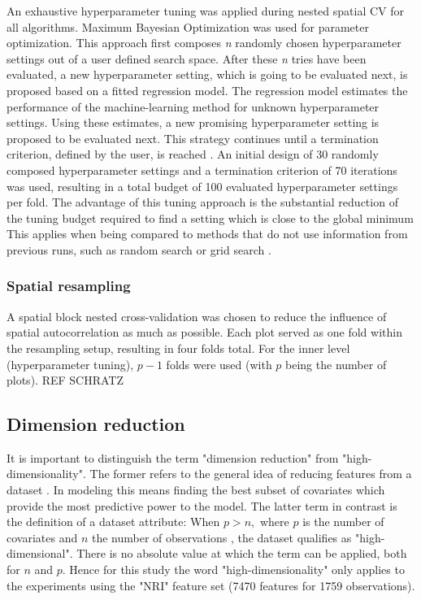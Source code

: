 \documentclass[review]{elsarticle}
\begin{document}
\noindent An exhaustive hyperparameter tuning was applied during nested spatial \ac{CV} for all algorithms.
Maximum Bayesian Optimization \citep{mlrmbo} was used for parameter optimization.
This approach first composes \textit{n} randomly chosen hyperparameter settings out of a user defined search space.
After these \textit{n} tries have been evaluated, a new hyperparameter setting, which is going to be evaluated next, is proposed based on a fitted regression model.
The regression model estimates the performance of the machine-learning method for unknown hyperparameter settings.
Using these estimates, a new promising hyperparameter setting is proposed to be evaluated next.
This strategy continues until a termination criterion, defined by the user, is reached \citep{hutter2011, jones1998}.
An initial design of 30 randomly composed hyperparameter settings and a termination criterion of 70 iterations was used, resulting in a total budget of 100 evaluated hyperparameter settings per fold.
The advantage of this tuning approach is the substantial reduction of the tuning budget required to find a setting which is close to the global minimum
This applies when being compared to methods that do not use information from previous runs, such as random search or grid search \citep{bergstra2012}.

\subsubsection{Spatial resampling}


\noindent A spatial block nested cross-validation was chosen to reduce the influence of spatial autocorrelation as much as possible.
Each plot served as one fold within the resampling setup, resulting in four folds total.
For the inner level (hyperparameter tuning), $p - 1$ folds were used (with $p$ being the number of plots). REF SCHRATZ

\subsection{Dimension reduction}

\noindent It is important to distinguish the term "dimension reduction" from "high-dimensionality".
The former refers to the general idea of reducing features from a dataset \citep{vandermaaten2007}.
In modeling this means finding the best subset of covariates which provide the most predictive power to the model.
The latter term in contrast is the definition of a dataset attribute:
When $p > n,$ where $p$ is the number of covariates and $n$ the number of observations \citep{hastie2001}, the dataset qualifies as "high-dimensional".
There is no absolute value at which the term can be applied, both for $n$ and $p$.
Hence for this study the word "high-dimensionality" only applies to the experiments using the "NRI" feature set (7470 features for 1759 observations).
\end{document}
